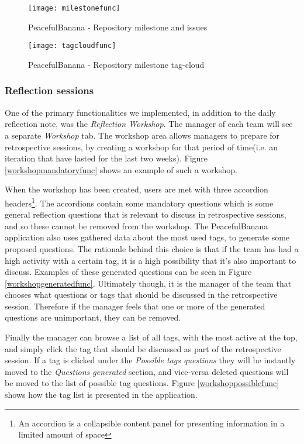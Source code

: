 \begin{figure}[H]
    \centering
        \texttt{[image: milestonefunc]}
    \caption{PeacefulBanana - Repository milestone and issues}
    \label{milestonefunc}
\end{figure}

\begin{figure}[H]
    \centering
        \texttt{[image: tagcloudfunc]}
    \caption{PeacefulBanana - Repository milestone tag-cloud}
    \label{tagcloudfunc}
\end{figure}

\subsubsection{Reflection sessions}
One of the primary functionalities we implemented, in addition to the daily reflection note, was the \emph{Reflection Workshop}. The manager of each team will see a separate \emph{Workshop} tab. The workshop area allows managers to prepare for retrospective sessions, by creating a workshop for that period of time(i.e. an iteration that have lasted for the last two weeks). Figure \ref{workshopmandatoryfunc} shows an example of such a workshop. 

When the workshop has been created, users are met with three accordion headers\footnote{An accordion is a collapsible content panel for presenting information in a limited amount of space}. The accordions contain some mandatory questions which is some general reflection questions that is relevant to discuss in retrospective sessions, and so these cannot be removed from the workshop. The PeacefulBanana application also uses gathered data about the most used tags, to generate some proposed questions. The rationale behind this choice is that if the team has had a high activity with a certain tag, it is a high possibility that it's also important to discuss. Examples of these generated questions can be seen in Figure \ref{workshopgeneratedfunc}. Ultimately though, it is the manager of the team that chooses what questions or tags that should be discussed in the retrospective session. Therefore if the manager feels that one or more of the generated questions are unimportant, they can be removed. 

Finally the manager can browse a list of all tags, with the most active at the top, and simply click the tag that should be discussed as part of the retrospective session. If a tag is clicked under the \emph{Possible tags questions} they will be instantly moved to the \emph{Questions generated} section, and vice-versa deleted questions will be moved to the list of possible tag questions. Figure \ref{workshoppossiblefunc} shows how the tag list is presented in the application. 

